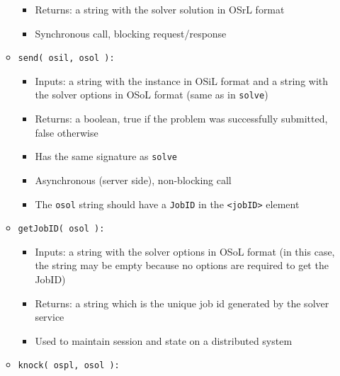 \documentclass[11pt]{article}
\renewcommand{\_}{{\char"5F}}
\renewcommand{\{}{{\char"7B}}
\renewcommand{\}}{{\char"7D}}
\renewcommand{\^}{{\char"0D}}
\renewcommand{\'}{{\char"0D}}
\begin{document}
\begin{enumerate}[Step 1:]
\begin{itemize}
\begin{itemize}
\item Returns: a string with the solver solution in OSrL format

\item Synchronous call, blocking request/response

\end{itemize}



\item {\tt send( osil, osol ):}

\begin{itemize}

\item Inputs: a string with the instance in OSiL format and a string with the solver options 
in OSoL format (same as in {\tt solve})

\item Returns:  a boolean, true if the problem was successfully submitted, false otherwise

\item Has the same signature as {\tt solve}

\item Asynchronous (server side), non-blocking call

\item The {\tt osol} string should have a {\tt JobID} in the {\tt <jobID>} element
\end{itemize}


\item {\tt getJobID( osol ):}

\begin{itemize}

\item Inputs: a string  with the solver options in OSoL format (in this case, the string 
may be empty because no options are required to get the JobID)

\item Returns: a string which is the unique job id generated by the solver service

\item Used to maintain session and state on a distributed system
\end{itemize}



\item {\tt knock( ospl, osol ):}


\end{itemize}
\end{enumerate}
\end{document}
